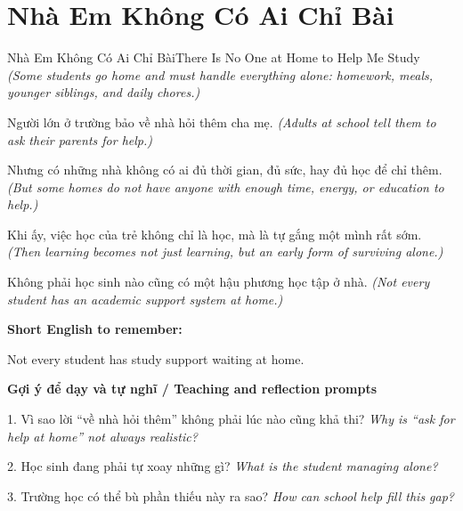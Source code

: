 \section{Nhà Em Không Có Ai Chỉ Bài}
\begin{truyen}{Nhà Em Không Có Ai Chỉ Bài}{There Is No One at Home to Help Me Study}
\textit{(Some students go home and must handle everything alone: homework, meals, younger siblings, and daily chores.)}

Người lớn ở trường bảo về nhà hỏi thêm cha mẹ.
\textit{(Adults at school tell them to ask their parents for help.)}

Nhưng có những nhà không có ai đủ thời gian, đủ sức, hay đủ học để chỉ thêm.
\textit{(But some homes do not have anyone with enough time, energy, or education to help.)}

Khi ấy, việc học của trẻ không chỉ là học, mà là tự gắng một mình rất sớm.
\textit{(Then learning becomes not just learning, but an early form of surviving alone.)}

\end{truyen}

\begin{baihoc}
Không phải học sinh nào cũng có một hậu phương học tập ở nhà.
\textit{(Not every student has an academic support system at home.)}
\end{baihoc}

\begin{ghinhoanh}
\textbf{Short English to remember:}

Not every student has study support waiting at home.

\end{ghinhoanh}

\begin{tuhocnhanh}
\textbf{Gợi ý để dạy và tự nghĩ / Teaching and reflection prompts}

1. Vì sao lời “về nhà hỏi thêm” không phải lúc nào cũng khả thi? \textit{Why is “ask for help at home” not always realistic?}

2. Học sinh đang phải tự xoay những gì? \textit{What is the student managing alone?}

3. Trường học có thể bù phần thiếu này ra sao? \textit{How can school help fill this gap?}
\end{tuhocnhanh}
\ngancach

